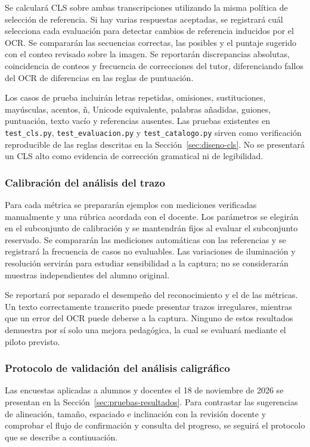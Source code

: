 Se calculará CLS sobre ambas transcripciones utilizando la misma política de selección de referencia. Si hay varias respuestas aceptadas, se registrará cuál selecciona cada evaluación para detectar cambios de referencia inducidos por el OCR. Se compararán las secuencias correctas, las posibles y el puntaje sugerido con el conteo revisado sobre la imagen. Se reportarán discrepancias absolutas, coincidencia de conteos y frecuencia de correcciones del tutor, diferenciando fallos del OCR de diferencias en las reglas de puntuación.

Los casos de prueba incluirán letras repetidas, omisiones, sustituciones, mayúsculas, acentos, ñ, Unicode equivalente, palabras añadidas, guiones, puntuación, texto vacío y referencias ausentes. Las pruebas existentes en \texttt{test\_cls.py}, \texttt{test\_evaluacion.py} y \texttt{test\_catalogo.py} sirven como verificación reproducible de las reglas descritas en la Sección~\ref{sec:diseno-cls}. No se presentará un CLS alto como evidencia de corrección gramatical ni de legibilidad.

\subsubsection{Calibración del análisis del trazo}
Para cada métrica se prepararán ejemplos con mediciones verificadas manualmente y una rúbrica acordada con el docente. Los parámetros se elegirán en el subconjunto de calibración y se mantendrán fijos al evaluar el subconjunto reservado. Se compararán las mediciones automáticas con las referencias y se registrará la frecuencia de casos no evaluables. Las variaciones de iluminación y resolución servirán para estudiar sensibilidad a la captura; no se considerarán muestras independientes del alumno original.

Se reportará por separado el desempeño del reconocimiento y el de las métricas. Un texto correctamente transcrito puede presentar trazos irregulares, mientras que un error del OCR puede deberse a la captura. Ninguno de estos resultados demuestra por sí solo una mejora pedagógica, la cual se evaluará mediante el piloto previsto.

\subsubsection{Protocolo de validación del análisis caligráfico}
\label{sec:sesion-validacion-legibilidad}
Las encuestas aplicadas a alumnos y docentes el 18 de noviembre de 2026 se presentan en la Sección~\ref{sec:pruebas-resultados}. Para contrastar las sugerencias de alineación, tamaño, espaciado e inclinación con la revisión docente y comprobar el flujo de confirmación y consulta del progreso, se seguirá el protocolo que se describe a continuación.


